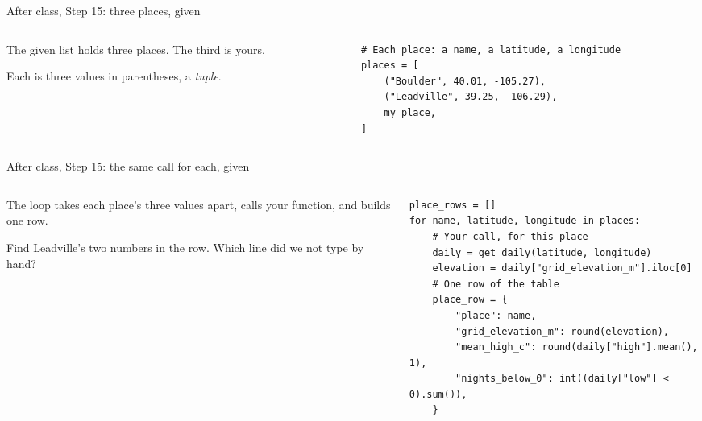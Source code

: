\documentclass[9pt,aspectratio=169]{beamer}
\begin{document}
\begin{frame}[fragile]{After class, Step 15: three places, given}
    \begin{columns}[T]
        \begin{column}{0.37\textwidth}
            The given list holds three places. The third is yours.

            \medskip
            Each is three values in parentheses, a \textit{tuple}.
        \end{column}
        \begin{column}{0.6\textwidth}
\begin{lstlisting}
# Each place: a name, a latitude, a longitude
places = [
    ("Boulder", 40.01, -105.27),
    ("Leadville", 39.25, -106.29),
    my_place,
]
\end{lstlisting}
        \end{column}
    \end{columns}
\end{frame}

\begin{frame}[fragile]{After class, Step 15: the same call for each, given}
    \begin{columns}[T]
        \begin{column}{0.37\textwidth}
            The loop takes each place's three values apart, calls your function, and builds one row.

            \medskip
            Find Leadville's two numbers in the row. Which line did we not type by hand?
        \end{column}
        \begin{column}{0.6\textwidth}
\begin{lstlisting}
place_rows = []
for name, latitude, longitude in places:
    # Your call, for this place
    daily = get_daily(latitude, longitude)
    elevation = daily["grid_elevation_m"].iloc[0]
    # One row of the table
    place_row = {
        "place": name,
        "grid_elevation_m": round(elevation),
        "mean_high_c": round(daily["high"].mean(), 1),
        "nights_below_0": int((daily["low"] < 0).sum()),
    }
\end{lstlisting}
        \end{column}
    \end{columns}
\end{frame}
\end{document}
